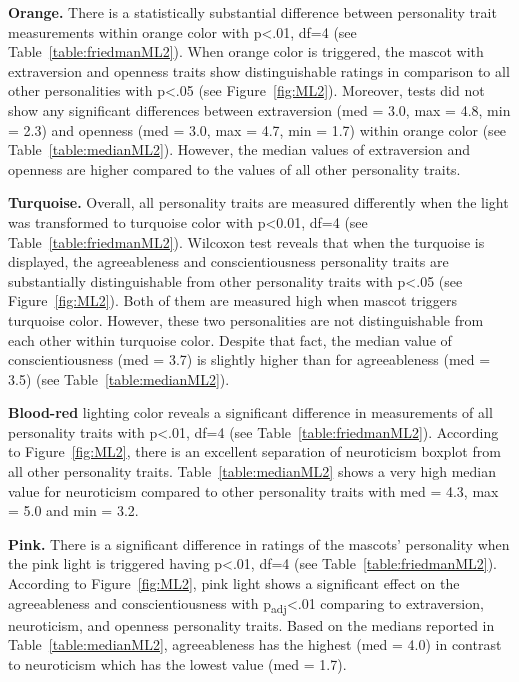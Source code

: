 \par\textbf{Orange.}
There is a statistically substantial difference between personality trait measurements within
orange color with p<.01, df=4 (see Table~\ref{table:friedmanML2}).
When orange color is triggered, the mascot with extraversion and openness traits
show distinguishable ratings in comparison to all other personalities with p<.05 (see Figure~\ref{fig:ML2}).
Moreover, tests did not show any significant differences between extraversion (med = 3.0, max = 4.8, min = 2.3)
and openness (med = 3.0, max = 4.7, min = 1.7) within orange color (see Table~\ref{table:medianML2}).
However, the median values of extraversion and openness are higher compared to the
values of all other personality traits.

\par\textbf{Turquoise.}
Overall, all personality traits are measured differently when the light was transformed to turquoise color
with p<0.01, df=4 (see Table~\ref{table:friedmanML2}).
Wilcoxon test reveals that when the turquoise is displayed, the agreeableness and conscientiousness
personality traits are substantially distinguishable from other personality traits with p<.05 (see Figure~\ref{fig:ML2}).
Both of them are measured high when mascot triggers turquoise color.
However, these two personalities are not distinguishable from each other within turquoise color.
Despite that fact, the median value of conscientiousness (med = 3.7) is slightly higher than
for agreeableness (med = 3.5) (see Table~\ref{table:medianML2}).

\par\textbf{Blood-red}
lighting color reveals a significant difference in measurements of all personality traits
with p<.01, df=4 (see Table~\ref{table:friedmanML2}).
According to Figure~\ref{fig:ML2}, there is an excellent separation of neuroticism boxplot from all other personality traits.
Table~\ref{table:medianML2} shows a very high median value for neuroticism compared to other
personality traits with med = 4.3, max = 5.0 and min = 3.2.

\par\textbf{Pink.}
There is a significant difference in ratings of the mascots' personality when the pink light is
triggered having p<.01, df=4 (see Table~\ref{table:friedmanML2}).
According to Figure~\ref{fig:ML2}, pink light shows a significant effect on the agreeableness
and conscientiousness with p\textsubscript{adj}<.01 comparing to extraversion, neuroticism, and openness personality traits.
Based on the medians reported in Table~\ref{table:medianML2}, agreeableness has the
highest (med = 4.0) in contrast to neuroticism which has the lowest value (med = 1.7).

